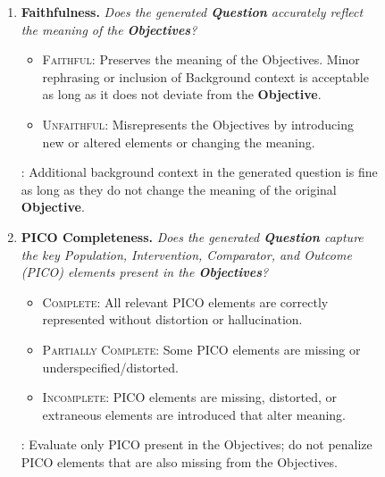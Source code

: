 \documentclass{article}
\begin{document}
\begin{figure}[h!]
\begin{small}
\begin{tcolorbox}[colback=gray!5, colframe=black, width=\textwidth, title=\textbf{Annotation Guideline for Evaluating Generated Questions}, fonttitle=\bfseries]
\begin{enumerate}[leftmargin=0.6cm]
    \item \textbf{Faithfulness.} \textit{Does the generated \textbf{Question} accurately reflect the meaning of the \textbf{Objectives}?} 
    \vspace{-0.2em}
    \begin{itemize}[leftmargin=0.5cm]
    \item\textsc{Faithful}: Preserves the meaning of the Objectives. Minor rephrasing or inclusion of Background context is acceptable as long as it does not deviate from the \textbf{Objective}. 
    \item\textsc{Unfaithful}: Misrepresents the Objectives by introducing new or altered elements or changing the meaning.
    \end{itemize}
    : Additional background context in the generated question is fine as long as they do not change the meaning of the original \textbf{Objective}. 

    \vspace{0.5em}
    \item \textbf{PICO Completeness.} \textit{Does the generated \textbf{Question} capture the key Population, Intervention, Comparator, and Outcome (PICO) elements present in the \textbf{Objectives}?}
    \vspace{-0.2em}
    \begin{itemize}[leftmargin=0.5cm]
    \item\textsc{Complete}: All relevant PICO elements are correctly represented without distortion or hallucination. 
    \item\textsc{Partially Complete}: Some PICO elements are missing or underspecified/distorted. 
    \item\textsc{Incomplete}: PICO elements are missing, distorted, or extraneous elements are introduced that alter meaning.
    \end{itemize}
    : Evaluate only PICO present in the Objectives; do not penalize PICO elements that are also missing from the Objectives. 


\end{enumerate}
\end{tcolorbox}
\end{small}
\end{figure}
\end{document}
